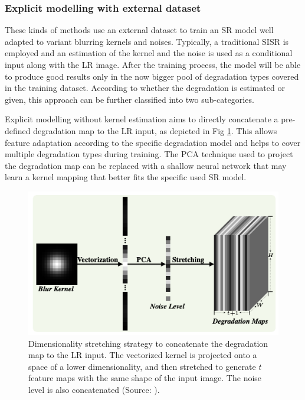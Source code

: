         \subsubsection{Explicit modelling with external dataset}

        These kinds of methods use an external dataset to train an SR model well adapted to  variant blurring kernels and noises. 
        Typically, a traditional SISR is employed and an estimation of the kernel and the noise is used as a conditional input along with the LR image.
        After the training process, the model will be able to produce good results only in the now bigger pool of degradation types covered in the training dataset.
        According to whether the degradation is estimated or given, this approach can be further classified into two sub-categories.


        Explicit modelling without kernel estimation aims to directly concatenate a pre-defined degradation map to the LR input, as depicted in Fig \ref{fig:2-external-dataset-stretching}. 
        This allows feature adaptation according to the specific degradation model and helps to cover multiple degradation types during training. 
        The PCA technique used to project the degradation map can be replaced with a shallow neural network that may learn a kernel mapping that better fits the specific used SR model.

        \begin{figure}[H]
            \centering
            \includegraphics[width=\textwidth]{Includes/2-external-dataset-stretching.png}
            \caption{Dimensionality stretching strategy to concatenate the degradation map to the LR input. 
                     The vectorized kernel is projected onto a space of a lower dimensionality, and then stretched to generate $t$ feature maps with the same shape of the input image.
                     The noise level is also concatenated (Source: \cite{zhang2018residual}).}    
            \label{fig:2-external-dataset-stretching}
        \end{figure}

